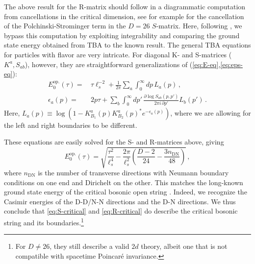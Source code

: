 \documentclass[
 reprint,
 amsmath,
 pre,
 amssymb,
 nofootinbib,
 aps,
 longbibliography,
]{revtex4-1}
\newcommand{\<}{{\langle}}
\renewcommand{\>}{{\rangle}}
\begin{document}
The above result for the R-matrix should follow in a diagrammatic computation
from cancellations in the critical dimension, see for example \cite{Dubovsky:2012sh} for the cancellation of the Polchinski-Strominger term \cite{Polchinski:1991ax} in the $D=26$ $S$-matrix. Here, following \cite{Dubovsky:2012wk}, we bypass this computation by exploiting integrability and comparing the ground state energy obtained from TBA to the known result. The general TBA equations for particles with flavor are very intricate. For diagonal K- and S-matrices ($K^a, S_{ab}$), however, they are straightforward generalizations of (\ref{eq:E-eq},\ref{eq:eps-eq}):
\begin{align}
    E_0^{\text{op.}}(\tau) =&\, \tau \ell_s^{-2} + \frac{1}{2\pi}\sum_a\int_0^\infty dp\, L_a(p)\,,\\
    \epsilon_a(p) =&\, 2p \tau
    +\sum_b \int_0^\infty dp'\, \frac{\partial \log S_{ab}(p,p')}{2\pi i\,  \partial p'} L_b(p')\,.\nonumber
\end{align}
Here, $L_a(p) \equiv \log \left(1-K_{B_1}^a(p)K_{B_2}^a(p)^* e^{-\epsilon_a (p)}\right)$, where we are allowing for the left and right boundaries to be different.

These equations are easily solved for the S- and R-matrices above, giving
\begin{equation}
    E_0^{\text{op.}}(\tau) = \sqrt{\frac{\tau^2}{\ell_s^4} - \frac{2\pi}{\ell_s^2}\left(\frac{D-2}{24} -\frac{3n_{\text{DN}}}{48}\right)}\,,
\end{equation}
where $n_{\text{DN}}$ is the number of transverse directions with Neumann boundary conditions on one end and Dirichelt on the other. This matches the long-known ground state energy of the critical bosonic open string \cite{Siegel:1976qn,Arvis:1983fp}. Indeed, we recognize the Casimir energies of the D-D/N-N directions and the D-N directions. We thus conclude that \eqref{eq:S-critical} and \eqref{eq:R-critical} do describe the critical bosonic string and its boundaries.\footnote{For $D\neq 26$, they still describe a valid $2d$ theory, albeit one that is not compatible with spacetime Poincar\'e invariance.}
\end{document}
